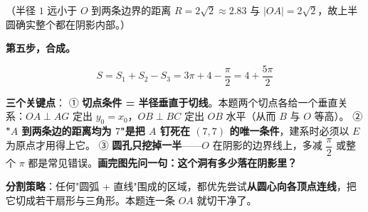 \begin{answer}
（半径 $1$ 远小于 $O$ 到两条边界的距离 $R=2\sqrt2\approx2.83$ 与 $|OA|=2\sqrt2$，故上半圆确实整个都在阴影内部。）

\textbf{第五步，合成。}

\nopagebreak[4]
\[S=S_1+S_2-S_3=3\pi+4-\frac\pi2=4+\frac{5\pi}2\]

\begin{gktip}
\textbf{三个关键点}：
① \textbf{切点条件 = 半径垂直于切线}。本题两个切点各给一个垂直关系：$OA\perp AG$ 定出 $y_0=x_0$，$OB\perp BC$ 定出 $OB$ 水平（从而 $B$ 与 $O$ 等高）。
② \textbf{"$A$ 到两条边的距离均为 $7$"是把 $A$ 钉死在 $(7,7)$ 的唯一条件}，建系时必须以 $E$ 为原点才用得上它。
③ \textbf{圆孔只挖掉一半}——$O$ 在阴影的边界线上，多减 $\dfrac\pi2$ 或整个 $\pi$ 都是常见错误。\textbf{画完图先问一句：这个洞有多少落在阴影里？}

\textbf{分割策略}：任何"圆弧 + 直线"围成的区域，都优先尝试\textbf{从圆心向各顶点连线}，把它切成若干扇形与三角形。本题连一条 $OA$ 就切干净了。
\end{gktip}


\par\medskip

\end{answer}

